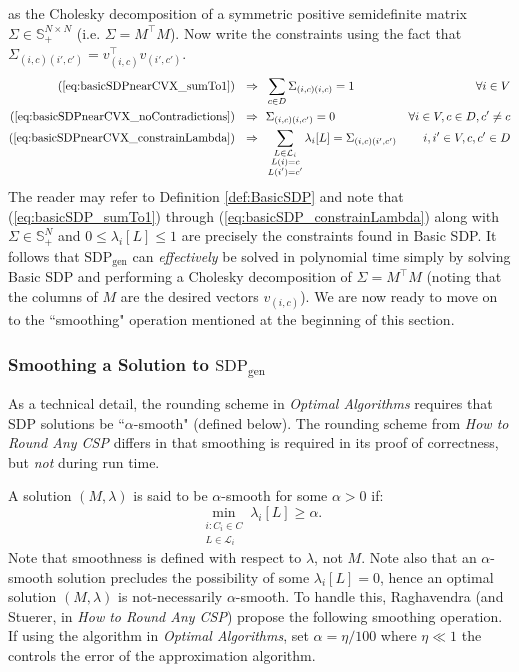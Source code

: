 \documentclass[letterpaper, 12pt]{article}
\numberwithin{equation}{section}
\begin{document}
as the Cholesky decomposition of a symmetric positive semidefinite matrix $\Sigma \in \mathbb{S}_+^{N \times N}$ (i.e. $\Sigma = M^\intercal M$). Now write the constraints using the fact that $\Sigma_{(i,c)(i',c')} = v_{(i,c)}^\intercal v_{(i',c')}$.
\begin{alignat}{2}
(\ref{eq:basicSDPnearCVX_sumTo1}) ~~\Rightarrow & ~~\sum_{c \in D} \Sigma_{(i,c)(i,c)} = 1 & \forall i \in V \label{eq:basicSDP_sumTo1} \\
(\ref{eq:basicSDPnearCVX_noContradictions}) ~~\Rightarrow &~~\Sigma_{(i,c)(i,c')} = 0 & \forall i \in V, c \in D, c' \neq c \label{eq:basicSDP_noContradictions} \\
(\ref{eq:basicSDPnearCVX_constrainLambda})~~ \Rightarrow & ~~\sum_{\substack{L \in \mathcal{L}_i \\ L(i) = c \\ L(i') = c' }} \lambda_i[L] =\Sigma_{(i,c)(i',c')} &  i,i' \in V, c,c' \in D \label{eq:basicSDP_constrainLambda}
\end{alignat}
The reader may refer to Definition \ref{def:BasicSDP} and note that (\ref{eq:basicSDP_sumTo1}) through (\ref{eq:basicSDP_constrainLambda}) along with $\Sigma \in \mathbb{S}^N_+$ and $0 \leq \lambda_i[L] \leq 1$ are precisely the constraints found in Basic SDP. It follows that $\text{SDP}_{\text{gen}}$ can \textit{effectively} be solved in polynomial time simply by solving Basic SDP and performing a Cholesky decomposition of $\Sigma = M^\intercal M$ (noting that the columns of $M$ are the desired vectors $v_{(i,c)}$). We are now ready to move on to the ``smoothing" operation mentioned at the beginning of this section. 

\subsubsection{Smoothing a Solution to $\text{SDP}_{\text{gen}}$}
As a technical detail, the rounding scheme in \textit{Optimal Algorithms} requires that SDP solutions be ``$\alpha$-smooth" (defined below). The rounding scheme from \textit{How to Round Any CSP} differs in that smoothing is required in its proof of correctness, but \textit{not} during run time. 

A solution $(M,\lambda)$ is said to be $\alpha$-smooth for some $\alpha >0 $ if:
\begin{equation}
\min_{\substack{ i : C_i \in C \\ L \in \mathcal{L}_i }} \lambda_i[L] \geq \alpha.
\end{equation}
Note that smoothness is defined with respect to $\lambda$, not $M$. Note also that an $\alpha$-smooth solution precludes the possibility of some $\lambda_i[L] = 0$, hence an optimal solution $(M, \lambda)$ is not-necessarily $\alpha$-smooth. To handle this, Raghavendra (and Stuerer, in \textit{How to Round Any CSP}) propose the following smoothing operation. If using the algorithm in \textit{Optimal Algorithms}, set $\alpha = \eta / 100$ where $\eta \ll 1$ the controls the error of the approximation algorithm.
\end{document}

